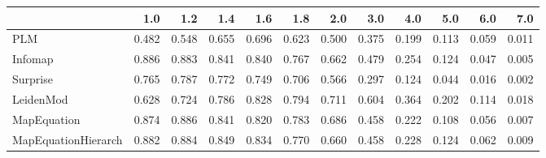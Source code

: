 \begin{tabular}{lrrrrrrrrrrr}
\toprule
{} &   1.0 &   1.2 &   1.4 &   1.6 &   1.8 &   2.0 &   3.0 &   4.0 &   5.0 &   6.0 &   7.0 \\
\midrule
PLM                 & 0.482 & 0.548 & 0.655 & 0.696 & 0.623 & 0.500 & 0.375 & 0.199 & 0.113 & 0.059 & 0.011 \\
Infomap             & 0.886 & 0.883 & 0.841 & 0.840 & 0.767 & 0.662 & 0.479 & 0.254 & 0.124 & 0.047 & 0.005 \\
Surprise            & 0.765 & 0.787 & 0.772 & 0.749 & 0.706 & 0.566 & 0.297 & 0.124 & 0.044 & 0.016 & 0.002 \\
LeidenMod           & 0.628 & 0.724 & 0.786 & 0.828 & 0.794 & 0.711 & 0.604 & 0.364 & 0.202 & 0.114 & 0.018 \\
MapEquation         & 0.874 & 0.886 & 0.841 & 0.820 & 0.783 & 0.686 & 0.458 & 0.222 & 0.108 & 0.056 & 0.007 \\
MapEquationHierarch & 0.882 & 0.884 & 0.849 & 0.834 & 0.770 & 0.660 & 0.458 & 0.228 & 0.124 & 0.062 & 0.009 \\
\bottomrule
\end{tabular}

